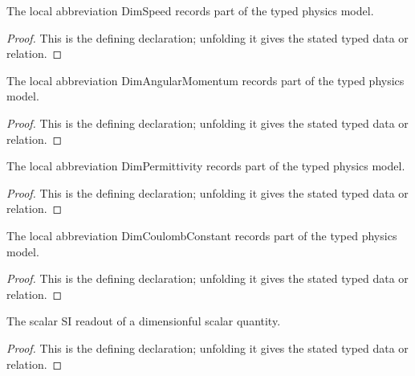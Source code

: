 \begin{definition}[DimSpeed]
  \label{decl:physics:IPhO_2026_1_B_2:DimSpeed}
  The local abbreviation DimSpeed records part of the typed physics model.
\end{definition}
\begin{proof}
  This is the defining declaration; unfolding it gives the stated typed data or relation.
\end{proof}

\begin{definition}[DimAngularMomentum]
  \label{decl:physics:IPhO_2026_1_B_2:DimAngularMomentum}
  The local abbreviation DimAngularMomentum records part of the typed physics model.
\end{definition}
\begin{proof}
  This is the defining declaration; unfolding it gives the stated typed data or relation.
\end{proof}

\begin{definition}[DimPermittivity]
  \label{decl:physics:IPhO_2026_1_B_2:DimPermittivity}
  The local abbreviation DimPermittivity records part of the typed physics model.
\end{definition}
\begin{proof}
  This is the defining declaration; unfolding it gives the stated typed data or relation.
\end{proof}

\begin{definition}[DimCoulombConstant]
  \label{decl:physics:IPhO_2026_1_B_2:DimCoulombConstant}
  The local abbreviation DimCoulombConstant records part of the typed physics model.
\end{definition}
\begin{proof}
  This is the defining declaration; unfolding it gives the stated typed data or relation.
\end{proof}

\begin{definition}[scalarSI]
  \label{decl:physics:IPhO_2026_1_B_2:scalarSI}
  The scalar SI readout of a dimensionful scalar quantity.
\end{definition}
\begin{proof}
  This is the defining declaration; unfolding it gives the stated typed data or relation.
\end{proof}

